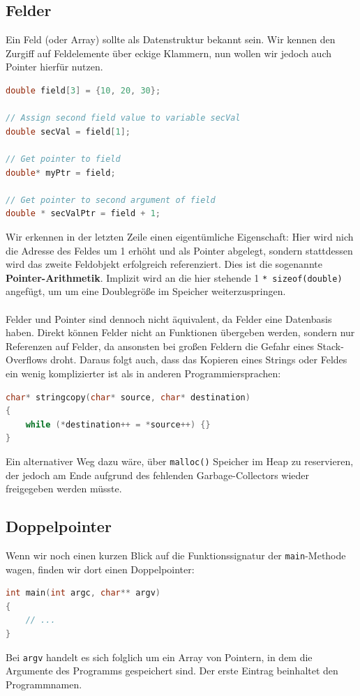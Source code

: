 \documentclass[11pt,a4paper]{scrartcl}
\begin{document}
\subsection{Felder}
Ein Feld (oder Array) sollte als Datenstruktur bekannt sein. Wir kennen den Zurgiff auf Feldelemente über eckige Klammern, nun wollen wir jedoch auch Pointer hierfür nutzen.
\begin{lstlisting}[language=C]
double field[3] = {10, 20, 30};

// Assign second field value to variable secVal
double secVal = field[1];		

// Get pointer to field
double* myPtr = field;

// Get pointer to second argument of field
double * secValPtr = field + 1;
\end{lstlisting}
Wir erkennen in der letzten Zeile einen eigentümliche Eigenschaft: Hier wird nich die Adresse des Feldes um 1 erhöht und als Pointer abgelegt, sondern stattdessen wird das zweite Feldobjekt erfolgreich referenziert. Dies ist die sogenannte \textbf{Pointer-Arithmetik}. Implizit wird an die hier stehende 1 \texttt{* sizeof(double)} angefügt, um um eine Doublegröße im Speicher weiterzuspringen. \\\\
Felder und Pointer sind dennoch nicht äquivalent, da Felder eine Datenbasis haben. Direkt können Felder nicht an Funktionen übergeben werden, sondern nur Referenzen auf Felder, da ansonsten bei großen Feldern die Gefahr eines Stack-Overflows droht. Daraus folgt auch, dass das Kopieren eines Strings oder Feldes ein wenig komplizierter ist als in anderen Programmiersprachen:
\begin{lstlisting}[language=C]
char* stringcopy(char* source, char* destination) 
{
	while (*destination++ = *source++) {}
}
\end{lstlisting}
Ein alternativer Weg dazu wäre, über \texttt{malloc()} Speicher im Heap zu reservieren, der jedoch am Ende aufgrund des fehlenden Garbage-Collectors wieder freigegeben werden müsste.
\subsection{Doppelpointer}
Wenn wir noch einen kurzen Blick auf die Funktionssignatur der \texttt{main}-Methode wagen, finden wir dort einen Doppelpointer:
\begin{lstlisting}[language=C]
int main(int argc, char** argv) 
{
	// ...
}
\end{lstlisting}
Bei \texttt{argv} handelt es sich folglich um ein Array von Pointern, in dem die Argumente des Programms gespeichert sind. Der erste Eintrag beinhaltet den Programmnamen.
\end{document}
